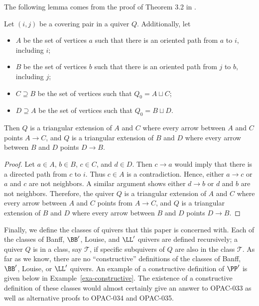 The following lemma comes from the proof of Theorem 3.2 in \cite{MR4108215}.

\begin{lemm} \label{lem-covering-pair-triangulation}
    Let $(i,j)$ be a covering pair in a quiver $Q$.
    Additionally, let
    \begin{itemize}
        \item $A$ be the set of vertices $a$ such that there is an oriented path from $a$ to $i$, including $i$;

        \item $B$ be the set of vertices $b$ such that there is an oriented path from $j$ to $b$, including $j$;

        \item $C \supseteq B$ be the set of vertices such that $Q_0 = A \sqcup C$;

        \item $D \supseteq A$ be the set of vertices such that $Q_0 = B \sqcup D$.
    \end{itemize} 
    Then $Q$ is a triangular extension of $A$ and $C$ where every arrow between $A$ and $C$ points $A \to C$, and $Q$ is a triangular extension of $B$ and $D$ where every arrow between $B$ and $D$ points $D \to B$.
\end{lemm}

\begin{proof}
    Let $a \in A$, $b \in B$, $c \in C$, and $d \in D$.
    Then $c \to a$ would imply that there is a directed path from $c$ to $i$.
    Thus $c \in A$ is a contradiction.
    Hence, either $a \to c$ or $a$ and $c$ are not neighbors.
    A similar argument shows either $d \to b$ or $d$ and $b$ are not neighbors.
    Therefore, the quiver $Q$ is a triangular extension of $A$ and $C$ where every arrow between $A$ and $C$ points from $A \to C$, and $Q$ is a triangular extension of $B$ and $D$ where every arrow between $B$ and $D$ points $D \to B$.
\end{proof}

Finally, we define the classes of quivers that this paper is concerned with.
Each of the classes of Banff, $\BB'$, Louise, and $\LL'$ quivers are defined recursively; a quiver $Q$ is in a class, say $\mathcal{T}$, if specific subquivers of $Q$ are also in the class $\mathcal{T}$.
As far as we know, there are no ``constructive'' definitions of the classes of Banff, $\BB'$, Louise, or $\LL'$ quivers. 
An example of a constructive definition of $\PP'$ is given below in Example~\ref{exa-constructive}.
The existence of a constructive definition of these classes would almost certainly give an answer to OPAC-033 as well as alternative proofs to OPAC-034 and OPAC-035.

